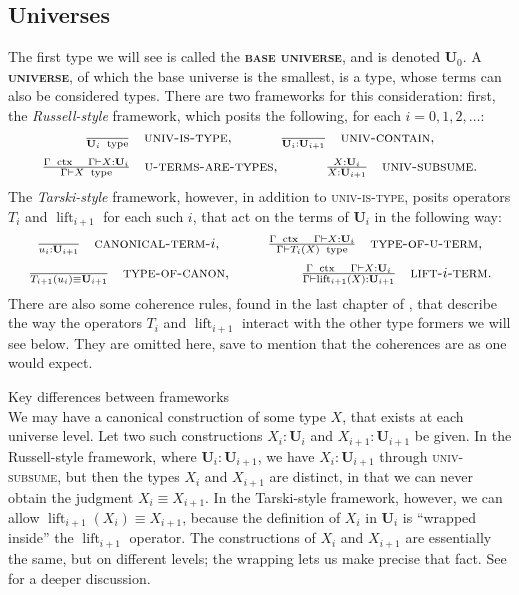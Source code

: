 \documentclass{article}
\newcommand{\defn}[1]{{\scshape\bfseries\color{MPBemph}#1}}
\newcommand{\infrule}[3]{\genfrac{}{}{}{}{#1}{#2}\hspace{1em}{\textsc{#3}}}
\DeclareMathOperator{\ctx}{~ctx}
\DeclareMathOperator{\type}{~type}
\newcommand{\gives}{\vdash}
\newcommand{\U}{\mathbf{U}}
\DeclareMathOperator{\lift}{lift}
\newcommand{\1}{\textbf{1}}
\newcommand{\0}{\mathbf{0}}
\newcommand{\2}{\textbf{2}}
\begin{document}
\subsection{Universes}
The first type we will see is called the \defn{base universe}, and is denoted \( \U_{0} \). A \defn{universe}, of which the base universe is the smallest, is a type, whose terms can also be considered types. There are two frameworks for this consideration: first, the \emph{Russell-style} framework, which posits the following, for each \( i = 0, 1, 2, \dotsc \):
\[ \OD \infrule{}{\U_{i} \type}{univ-is-type}, \hspace{33pt} \infrule{}{\U_{i} : \U_{i + 1}}{univ-contain}, \]
\[ \OD \infrule{\Gamma \ctx \hspace{1em} \Gamma \gives X : \U_{i}}{\Gamma \gives X \type}{u-terms-are-types}, \hspace{33pt} \infrule{X : \U_{i}}{X : \U_{i + 1}}{univ-subsume}. \]
The \emph{Tarski-style} framework, however, in addition to \textsc{univ-is-type}, posits operators \( T_{i} \) and \( \lift_{i + 1} \) for each such \( i \), that act on the terms of \( \U_{i} \) in the following way:
\[ \OD \infrule{}{u_{i} : \U_{i + 1}}{canonical-term-\( i \)}, \hspace{33pt} \infrule{\Gamma \ctx \hspace{1em} \Gamma \gives X : \U_{i}}{\Gamma \gives T_{i}(X) \type}{type-of-u-term}, \]
\[ \OD \infrule{}{T_{i + 1}(u_{i}) \equiv \U_{i + 1}}{type-of-canon}, \hspace{50pt} \infrule{\Gamma \ctx \hspace{1em} \Gamma \gives X : \U_{i}}{\Gamma \gives \lift_{i + 1}(X) : \U_{i + 1}}{lift-\( i \)-term}. \]
There are also some coherence rules, found in the last chapter of \cite{mltt}, that describe the way the operators \( T_{i} \) and \( \lift_{i + 1} \) interact with the other type formers we will see below. They are omitted here, save to mention that the coherences are as one would expect.
\begin{example}{Key differences between frameworks}{}~\\[3pt]
	We may have a canonical construction of some type \( X \), that exists at each universe level. Let two such constructions \( X_{i} : \U_{i} \) and \( X_{i + 1} : \U_{i + 1} \) be given. In the Russell-style framework, where \( \U_{i} : \U_{i + 1} \), we have \( X_{i} : \U_{i + 1} \) through \textsc{univ-subsume}, but then the types \( X_{i} \) and \( X_{i + 1} \) are distinct, in that we can never obtain the judgment \( X_{i} \equiv X_{i + 1} \). In the Tarski-style framework, however, we can allow \( \lift_{i + 1}(X_{i}) \equiv X_{i + 1} \), because the definition of \( X_{i} \) in \( \U_{i} \) is ``wrapped inside'' the \( \lift_{i + 1} \) operator. The constructions of \( X_{i} \) and \( X_{i + 1} \) are essentially the same, but on different levels; the wrapping lets us make precise that fact. See \cite{luo} for a deeper discussion.
\end{example}
\end{document}
